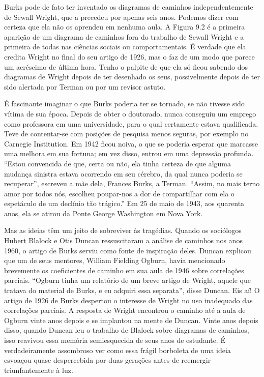 \documentclass[11pt,a5paper,twoside]{book}
\begin{document}
Burks pode de fato ter inventado os diagramas de caminhos independentemente de Sewall Wright, que a precedeu por apenas seis anos. Podemos dizer com certeza que ela não os aprendeu em nenhuma aula. A Figura 9.2 é a primeira aparição de um diagrama de caminhos fora do trabalho de Sewall Wright e a primeira de todas nas ciências sociais ou comportamentais. É verdade que ela credita Wright no final do seu artigo de 1926, mas o faz de um modo que parece um acréscimo de última hora. Tenho o palpite de que ela só ficou sabendo dos diagramas de Wright depois de ter desenhado os seus, possivelmente depois de ter sido alertada por Terman ou por um revisor astuto.

É fascinante imaginar o que Burks poderia ter se tornado, se não tivesse sido vítima de sua época. Depois de obter o doutorado, nunca conseguiu um emprego como professora em uma universidade, para o qual certamente estava qualificada. Teve de contentar-se com posições de pesquisa menos seguras, por exemplo no Carnegie Institution. Em 1942 ficou noiva, o que se poderia esperar que marcasse uma melhora em sua fortuna; em vez disso, entrou em uma depressão profunda. “Estou convencida de que, certa ou não, ela tinha certeza de que alguma mudança sinistra estava ocorrendo em seu cérebro, da qual nunca poderia se recuperar”, escreveu a mãe dela, Frances Burks, a Terman. “Assim, no mais terno amor por todos nós, escolheu poupar-nos a dor de compartilhar com ela o espetáculo de um declínio tão trágico.” Em 25 de maio de 1943, aos quarenta anos, ela se atirou da Ponte George Washington em Nova York.

Mas as ideias têm um jeito de sobreviver às tragédias. Quando os sociólogos Hubert Blalock e Otis Duncan ressuscitaram a análise de caminhos nos anos 1960, o artigo de Burks serviu como fonte de inspiração deles. Duncan explicou que um de seus mentores, William Fielding Ogburn, havia mencionado brevemente os coeficientes de caminho em sua aula de 1946 sobre correlações parciais. “Ogburn tinha um relatório de um breve artigo de Wright, aquele que tratava do material de Burks, e eu adquiri essa separata”, disse Duncan. Eis aí! O artigo de 1926 de Burks despertou o interesse de Wright no uso inadequado das correlações parciais. A resposta de Wright encontrou o caminho até a aula de Ogburn vinte anos depois e se implantou na mente de Duncan. Vinte anos depois disso, quando Duncan leu o trabalho de Blalock sobre diagramas de caminhos, isso reavivou essa memória semiesquecida de seus anos de estudante. É verdadeiramente assombroso ver como essa frágil borboleta de uma ideia esvoaçou quase despercebida por duas gerações antes de reemergir triunfantemente à luz.
\end{document}
